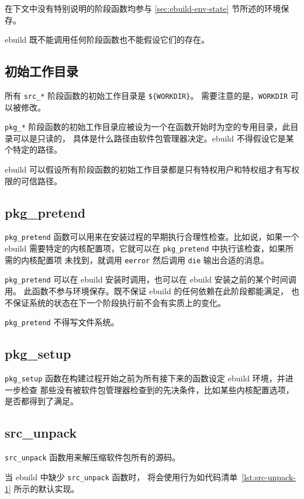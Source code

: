 在下文中没有特别说明的阶段函数均参与 \ref{sec:ebuild-env-state} 节所述的环境保存。

ebuild 既不能调用任何阶段函数也不能假设它们的存在。

\subsection{初始工作目录}
\label{sec:s-to-workdir-fallback}

所有 \texttt{src_*} 阶段函数的初始工作目录是 \texttt{\$\{WORKDIR\}}。
需要注意的是，\texttt{WORKDIR} 可以被修改。

\texttt{pkg_*} 阶段函数的初始工作目录应被设为一个在函数开始时为空的专用目录，此目录可以是只读的，
具体是什么路径由软件包管理器决定。ebuild 不得假设它是某个特定的路径。

ebuild 可以假设所有阶段函数的初始工作目录都是只有特权用户和特权组才有写权限的可信路径。

\subsection{pkg_pretend}

\texttt{pkg_pretend} 函数可以用来在安装过程的早期执行合理性检查。比如说，如果一个 ebuild
需要特定的内核配置项，它就可以在 \texttt{pkg_pretend} 中执行该检查，如果所需的内核配置项
未找到，就调用 \texttt{eerror} 然后调用 \texttt{die} 输出合适的消息。

\texttt{pkg_pretend} 可以在 ebuild 安装时调用，也可以在 ebuild 安装之前的某个时间调用。
此函数不参与环境保存。既不保证 ebuild 的任何依赖在此阶段都能满足，
也不保证系统的状态在下一个阶段执行前不会有实质上的变化。

\texttt{pkg_pretend} 不得写文件系统。

\subsection{pkg_setup}

\texttt{pkg_setup} 函数在构建过程开始之前为所有接下来的函数设定 ebuild 环境，并进一步检查
那些没有被软件包管理器检查到的先决条件，比如某些内核配置选项，是否都得到了满足。

\subsection{src_unpack}

\texttt{src_unpack} 函数用来解压缩软件包所有的源码。

当 ebuild 中缺少 \texttt{src_unpack} 函数时，
将会使用行为如代码清单~\ref{lst:src-unpack-1} 所示的默认实现。

